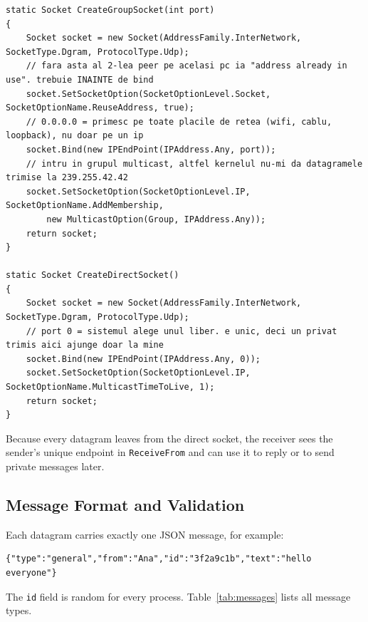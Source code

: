 \documentclass[11pt, a4paper]{article}
\begin{document}
\begin{lstlisting}[caption={Creating the two sockets (\texttt{Network.cs})}]
static Socket CreateGroupSocket(int port)
{
    Socket socket = new Socket(AddressFamily.InterNetwork, SocketType.Dgram, ProtocolType.Udp);
    // fara asta al 2-lea peer pe acelasi pc ia "address already in use". trebuie INAINTE de bind
    socket.SetSocketOption(SocketOptionLevel.Socket, SocketOptionName.ReuseAddress, true);
    // 0.0.0.0 = primesc pe toate placile de retea (wifi, cablu, loopback), nu doar pe un ip
    socket.Bind(new IPEndPoint(IPAddress.Any, port));
    // intru in grupul multicast, altfel kernelul nu-mi da datagramele trimise la 239.255.42.42
    socket.SetSocketOption(SocketOptionLevel.IP, SocketOptionName.AddMembership,
        new MulticastOption(Group, IPAddress.Any));
    return socket;
}

static Socket CreateDirectSocket()
{
    Socket socket = new Socket(AddressFamily.InterNetwork, SocketType.Dgram, ProtocolType.Udp);
    // port 0 = sistemul alege unul liber. e unic, deci un privat trimis aici ajunge doar la mine
    socket.Bind(new IPEndPoint(IPAddress.Any, 0));
    socket.SetSocketOption(SocketOptionLevel.IP, SocketOptionName.MulticastTimeToLive, 1);
    return socket;
}
\end{lstlisting}

Because every datagram leaves from the direct socket, the receiver sees the sender's unique endpoint in \texttt{ReceiveFrom} and can use it to reply or to send private messages later.

\subsection{Message Format and Validation}
Each datagram carries exactly one JSON message, for example:

\begin{lstlisting}[style=terminal]
{"type":"general","from":"Ana","id":"3f2a9c1b","text":"hello everyone"}
\end{lstlisting}

The \texttt{id} field is random for every process. Table~\ref{tab:messages} lists all message types.
\end{document}

